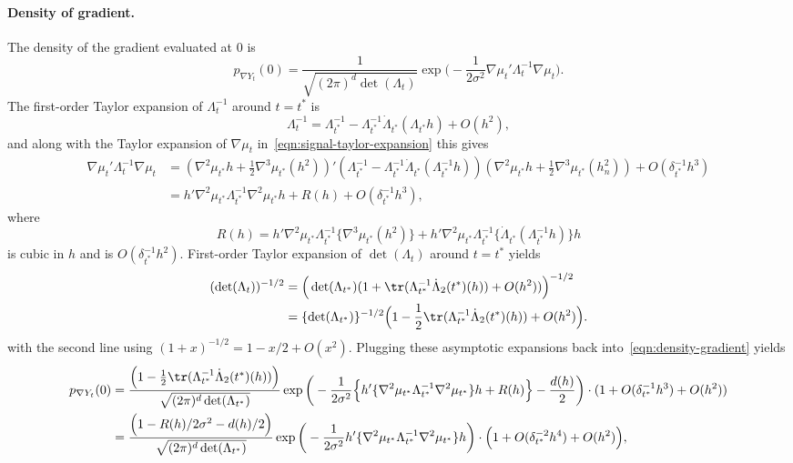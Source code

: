 \documentclass{article}
\begin{document}
	\paragraph{Density of gradient.}
	The density of the gradient evaluated at $0$ is
	\begin{equation}
		\label{eqn:density-gradient}
		p_{\nabla Y_t}(0) = \frac{1}{\sqrt{(2\pi)^d\det(\Lambda_t)}} \exp\Big(-\frac{1}{2\sigma^2} \nabla \mu_t' \Lambda_t^{-1}\nabla\mu_t\Big).
	\end{equation}
	The first-order Taylor expansion of $\Lambda_t^{-1}$ around $t = t^*$ is
	\begin{equation*}
		\Lambda_t^{-1} = \Lambda_{t^*}^{-1} - \Lambda_{t^*}^{-1}\dot{\Lambda}_{t^*}(\Lambda_{t^*}h) + O(h^2),
	\end{equation*}
	and along with the Taylor expansion of $\nabla \mu_t$ in~\eqref{eqn:signal-taylor-expansion} this gives
	\begin{align*}
		\nabla \mu_{t}' \Lambda_t^{-1} \nabla \mu_t 
		& = (\nabla^2 \mu_{t^*}h + \frac{1}{2}\nabla^3 \mu_{t^*}(h^2))'(\Lambda_{t^*}^{-1} - \Lambda_{t^*}^{-1}\dot{\Lambda}_{t^*}(\Lambda_{t^*}^{-1}h)) (\nabla^2 \mu_{t^*}h + \frac{1}{2}\nabla^3 \mu_{t^*}(h_n^2)) + O(\delta_{t^*}^{-1}h^3) \\
		& = h' \nabla^2 \mu_{t^*} \Lambda_{t^*}^{-1}  \nabla^2 \mu_{t^*} h + R(h) + O(\delta_{t^*}^{-1}h^3),
	\end{align*}
	where
	\begin{equation*}
		R(h) = h' \nabla^2 \mu_{t^*} \Lambda_{t^*}^{-1} \{\nabla^3\mu_{t^*}(h^2)\} +  h'\nabla^2 \mu_{t^*} \Lambda_{t^*}^{-1}\{\dot{\Lambda}_{t^*}(\Lambda_{t^*}^{-1}h)\} h
	\end{equation*}
	is cubic in $h$ and is $O(\delta_{t^*}^{-1}h^2)$. First-order Taylor expansion of $\det(\Lambda_t)$ around $t = t^*$ yields
	\begin{align*}
		(\det(\Lambda_t))^{-1/2} 
		& = \Big(\det(\Lambda_{t^*})(1 + \tr(\Lambda_{t^*}^{-1}\dot{\Lambda}_2(t^*)(h)) + O(h^2))\Big)^{-1/2} \\
		& = \{\det(\Lambda_{t^*})\}^{-1/2}\Big(1 - \frac{1}{2}\tr(\Lambda_{t^*}^{-1}\dot{\Lambda}_2(t^*)(h)) + O(h^2)\Big).
	\end{align*}
	with the second line using $(1 + x)^{-1/2} = 1 - x/2 + O(x^2)$. Plugging these asymptotic expansions back into~\eqref{eqn:density-gradient} yields
	\begin{equation*}
		\begin{aligned}
			p_{\nabla Y_t}(0) 
			& = \frac{\Big(1 - \frac{1}{2}\tr(\Lambda_{t^*}^{-1}\dot{\Lambda}_2(t^*)(h))\Big)}{\sqrt{(2\pi)^d\det(\Lambda_{t^*})}}\exp\bigg(-\frac{1}{2\sigma^2}\Big\{h' \{\nabla^2 \mu_{t^*} \Lambda_{t^*}^{-1}  \nabla^2 \mu_{t^*}\} h + R(h)\Big\}- \frac{d(h)}{2}\bigg) \cdot (1 + O(\delta_{t^*}^{-1}h^3) + O(h^2)) \\
			& = \frac{\Big(1 - R(h)/2\sigma^2 - d(h)/2\Big)}{\sqrt{(2\pi)^d\det(\Lambda_{t^*})}}\exp\bigg(-\frac{1}{2\sigma^2}h' \{\nabla^2 \mu_{t^*} \Lambda_{t^*}^{-1}  \nabla^2 \mu_{t^*}\} h \bigg) \cdot \Big(1 + O(\delta_{t^*}^{-2}h^4) + O(h^2)\Big),
		\end{aligned}
	\end{equation*}
\end{document}
